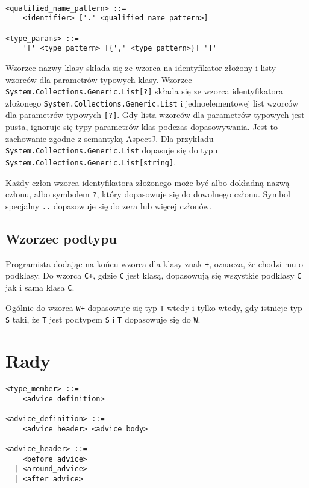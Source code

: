 \documentclass[a4paper,12pt]{mwbk}
\begin{document}
\begin{lstlisting}[style=grammar]

<qualified_name_pattern> ::=
    <identifier> ['.' <qualified_name_pattern>]

<type_params> ::=
    '[' <type_pattern> [{',' <type_pattern>}] ']'
\end{lstlisting}

Wzorzec nazwy klasy składa się ze wzorca na identyfikator złożony i listy wzorców dla
parametrów typowych klasy. Wzorzec
\lstinline!System.Collections.Generic.List[?]! składa się ze wzorca
identyfikatora złożonego \lstinline!System.Collections.Generic.List! i
jednoelementowej list wzorców dla parametrów typowych \lstinline![?]!.  Gdy
lista wzorców dla parametrów typowych jest pusta, ignoruje się typy parametrów
klas podczas dopasowywania. Jest to zachowanie zgodne z semantyką AspectJ. Dla
przykładu \lstinline!System.Collections.Generic.List! dopasuje się do typu
\lstinline!System.Collections.Generic.List[string]!.

Każdy człon wzorca identyfikatora złożonego może być albo dokładną nazwą
członu, albo symbolem \lstinline!?!, który dopasowuje się do dowolnego członu.
Symbol specjalny \lstinline!..! dopasowuje się do zera lub więcej członów.

\subsection{Wzorzec podtypu}\label{wzorzec_podtypu}

Programista dodając na końcu wzorca dla klasy znak \lstinline!+!, oznacza, że
chodzi mu o podklasy. Do wzorca \lstinline!C+!, gdzie \lstinline!C! jest klasą,
dopasowują się wszystkie podklasy \lstinline!C! jak i sama klasa \lstinline!C!.

Ogólnie do wzorca \lstinline!W+! dopasowuje się typ \lstinline!T! wtedy i
tylko wtedy, gdy istnieje typ \lstinline!S! taki, że \lstinline!T! jest
podtypem \lstinline!S! i \lstinline!T! dopasowuje się do \lstinline!W!.


\section{Rady}


\begin{lstlisting}[style=grammar]
<type_member> ::= 
    <advice_definition>

<advice_definition> ::= 
    <advice_header> <advice_body>

<advice_header> ::=
    <before_advice> 
  | <around_advice> 
  | <after_advice>
\end{lstlisting}
\end{document}
